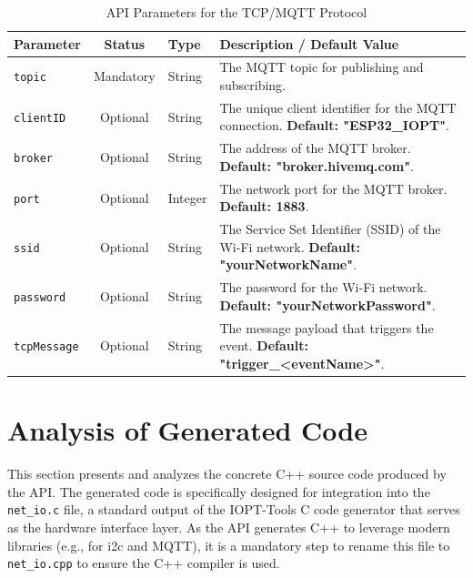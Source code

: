 \begin{table}[h!]
    \centering
    \caption{API Parameters for the TCP/MQTT Protocol}
    \label{tab:tcp_params}
    \begin{tabular}{|l|c|l|p{6cm}|}
        \hline
        \textbf{Parameter} & \textbf{Status} & \textbf{Type} & \textbf{Description / Default Value} \\ \hline
        \texttt{topic} & Mandatory & String & The MQTT topic for publishing and subscribing. \\ \hline
        \texttt{clientID} & Optional & String & The unique client identifier for the MQTT connection. \textbf{Default: "ESP32\_IOPT"}. \\ \hline
        \texttt{broker} & Optional & String & The address of the MQTT broker. \textbf{Default: "broker.hivemq.com"}. \\ \hline
        \texttt{port} & Optional & Integer & The network port for the MQTT broker. \textbf{Default: 1883}. \\ \hline
        \texttt{ssid} & Optional & String & The Service Set Identifier (SSID) of the Wi-Fi network. \textbf{Default: "yourNetworkName"}. \\ \hline
        \texttt{password} & Optional & String & The password for the Wi-Fi network. \textbf{Default: "yourNetworkPassword"}. \\ \hline
        \texttt{tcpMessage} & Optional & String & The message payload that triggers the event. \textbf{Default: "trigger\_<eventName>"}. \\ \hline
    \end{tabular}
\end{table}




\section{Analysis of Generated Code}
\label{sec:analysis_of_code}

This section presents and analyzes the concrete C++ source code produced by the API. The generated code is specifically designed for integration into the \texttt{net\_io.c} file, a standard output of the IOPT-Tools C code generator that serves as the hardware interface layer. As the API generates C++ to leverage modern libraries (e.g., for \gls{i2c} and MQTT), it is a mandatory step to rename this file to \texttt{net\_io.cpp} to ensure the C++ compiler is used.

